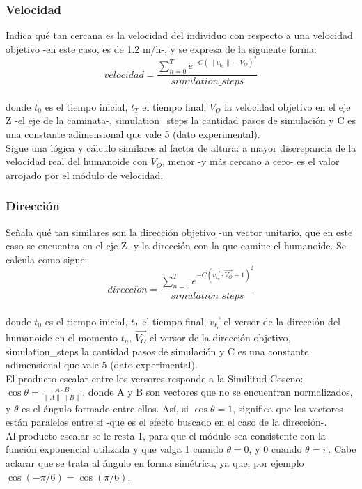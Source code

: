 \documentclass{article}
\begin{document}

\subsubsection{Velocidad}
\label{velocidad}
Indica qu\'e tan cercana es la velocidad del individuo con respecto a una velocidad objetivo -en este caso, es de 1.2 m/h-, y se expresa de la siguiente forma:\\
\begin{equation}
  velocidad = \frac{\sum_{n=0}^{T} {e^{-C( \|v_{t_{n}}\| - V_{O} )^2  }}}{simulation\_steps}
\end{equation}
\\ donde $t_{0}$ es el tiempo inicial, $t_{T}$ el tiempo final, $V_{O}$ la velocidad objetivo en el eje Z -el eje de la caminata-, simulation\_steps la cantidad pasos de simulaci\'on y C es una constante adimensional que vale 5 (dato experimental).
\\
Sigue una l\'ogica y c\'alculo similares al factor de altura: a mayor discrepancia de la velocidad real del humanoide con $V_{O}$, menor -y m\'as cercano a cero- es el valor arrojado por el m\'odulo de velocidad. 


\subsubsection{Direcci\'on}
\label{direccion}
Se\~nala qu\'e tan similares son la direcci\'on objetivo -un vector unitario, que en este caso se encuentra en el eje Z- y la direcci\'on con la que camine el humanoide. Se calcula como sigue:\\
\begin{equation}
 direcci\acute{o}n = \frac{\sum_{n=0}^{T} {e^{-C( \vec{v_{t_{n}}} \cdot \vec{V_{O} } -1)^2 } } }{simulation\_steps}
\end{equation}
\\ donde $t_{0}$ es el tiempo inicial, $t_{T}$ el tiempo final, $\vec{v_{t_{n}}}$ el versor de la direcci\'on del humanoide en el momento $t_{n}$, $\vec{V_{O}}$ el versor de la direcci\'on objetivo, simulation\_steps la cantidad pasos de simulaci\'on y C es una constante adimensional que vale 5 (dato experimental).
\\ El producto escalar entre los versores responde a la Similitud Coseno: $\cos \theta = \frac{A \cdot B} {\|A\|\|B\| } $, donde A y B son vectores que no se encuentran normalizados, y $\theta$ es el \'angulo formado entre ellos. As\'i,  si $\cos \theta=1$, significa que los vectores est\'an paralelos entre s\'i -que es el efecto buscado en el caso de la direcci\'on-. 
\\ Al producto escalar se le resta 1, para que el m\'odulo sea consistente con la funci\'on exponencial utilizada y que valga 1 cuando $\theta = 0$, y  0 cuando $\theta = \pi$. Cabe aclarar que se trata al \'angulo en forma sim\'etrica, ya que, por ejemplo $\cos(-\pi/6) = \cos(\pi/6)$.
\end{document}
